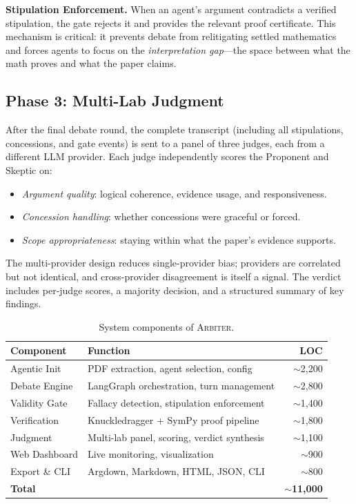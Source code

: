 \documentclass[11pt]{article}
\newcommand{\arbiter}{\textsc{Arbiter}}
\begin{document}
\noindent\textbf{Stipulation Enforcement.}
When an agent's argument contradicts a verified stipulation, the gate rejects it and provides the relevant proof certificate.
This mechanism is critical: it prevents debate from relitigating settled mathematics and forces agents to focus on the \emph{interpretation gap}---the space between what the math proves and what the paper claims.


\subsection{Phase 3: Multi-Lab Judgment}

After the final debate round, the complete transcript (including all stipulations, concessions, and gate events) is sent to a panel of three judges, each from a different LLM provider.
Each judge independently scores the Proponent and Skeptic on:
\begin{itemize}[leftmargin=*,itemsep=1pt]
\item \emph{Argument quality}: logical coherence, evidence usage, and responsiveness.
\item \emph{Concession handling}: whether concessions were graceful or forced.
\item \emph{Scope appropriateness}: staying within what the paper's evidence supports.
\end{itemize}

The multi-provider design reduces single-provider bias; providers are correlated but not identical, and cross-provider disagreement is itself a signal.
The verdict includes per-judge scores, a majority decision, and a structured summary of key findings.


\begin{table}[t]
\centering
\caption{System components of \arbiter{}.}
\label{tab:components}
\begin{tabular}{@{}llr@{}}
\toprule
\textbf{Component} & \textbf{Function} & \textbf{LOC} \\
\midrule
Agentic Init & PDF extraction, agent selection, config & $\sim$2,200 \\
Debate Engine & LangGraph orchestration, turn management & $\sim$2,800 \\
Validity Gate & Fallacy detection, stipulation enforcement & $\sim$1,400 \\
Verification & Knuckledragger + SymPy proof pipeline & $\sim$1,800 \\
Judgment & Multi-lab panel, scoring, verdict synthesis & $\sim$1,100 \\
Web Dashboard & Live monitoring, visualization & $\sim$900 \\
Export \& CLI & Argdown, Markdown, HTML, JSON, CLI & $\sim$800 \\
\midrule
\textbf{Total} & & $\sim$\textbf{11,000} \\
\bottomrule
\end{tabular}
\end{table}
\end{document}
